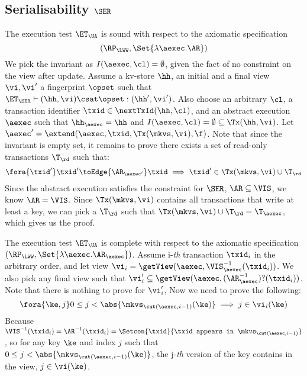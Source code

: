 \subsection{Serialisability \( \SER \)}
\label{sec:sound-complete-ser}

The execution test $\ET_\UA$ is sound with respect to the axiomatic specification 
\[ 
    (\RP_{\LWW}, \Set{\lambda \aexec. \AR })
\]
We pick the invariant as \( I( \aexec, \cl ) = \emptyset \), given the fact of no constraint on the view after update.
Assume a kv-store $\hh$, an initial and a final view $\vi, \vi'$  a fingerprint $\opset$ 
such that $\ET_{\SER} \vdash (\hh, \vi) \csat \opset: (\hh',\vi')$. 
Also choose an arbitrary $\cl$, a transaction identifier $\txid \in \nextTxId(\hh, \cl)$, 
and an abstract execution $\aexec$ such that $\hh_{\aexec} = \hh$ and 
\( I(\aexec, \cl) =  \emptyset \subseteq \Tx(\hh, \vi) \).
Let \( \aexec' = \extend(\aexec, \txid, \Tx(\mkvs, \vi), \f ) \).
Note that since the invariant is empty set, it remains to prove there exists a set of read-only transactions \( \T_\rd \) such that:
\[
    \begin{array}{@{}l@{}}
        \fora{ \txid' } 
        \txid' \toEdge{\AR_{\aexec'}} \txid \implies \txid' \in \Tx(\mkvs, \vi) \cup \T_\rd
    \end{array}
\]
Since the abstract execution satisfies the constraint for \( \SER \), \ie \( \AR \subseteq \VIS \), we know \( \AR = \VIS \).
Since \( \Tx(\mkvs, \vi)  \) contains all transactions that write at least a key, 
we can pick a \( \T_\rd \) such that \( \Tx(\mkvs, \vi) \cup \T_\rd = \T_\aexec\),
which gives us the proof.


The execution test $\ET_\UA$ is complete with respect to the axiomatic specification \( (\RP_{\LWW}, \Set{\lambda \aexec. \AR_\aexec }) \).
Assume i-\emph{th} transaction \( \txid_i \) in the arbitrary order,
and let view \( \vi_{i} = \getView(\aexec, \VIS^{-1}_{\aexec}(\txid_{i}) ) \).
We also pick any final view such that \( \vi'_{i} \subseteq \getView(\aexec, (\AR^{-1}_{\aexec})?(\txid_{i}) ) \).
Note that there is nothing to prove for \( \vi'_i \),
Now we need to prove the following:
\[
    \fora{\ke, j}  0 \leq j < \abs{\mkvs_{\cut(\aexec, i-1)}(\ke)} \implies j \in \vi_i(\ke)
\]
Because \( \VIS^{-1}(\txid_i) = \AR^{-1}(\txid_i) = \Setcon{\txid }{\txid \texttt{ appears in } \mkvs_{\cut(\aexec, i-1)} }\),
so for any key \( \ke \) and index \( j \) such that \( 0 \leq j < \abs{\mkvs_{\cut(\aexec, i-1)}(\ke)} \),
the j-\emph{th} version of the key contains in the view, \ie \( j \in \vi(\ke)\).


